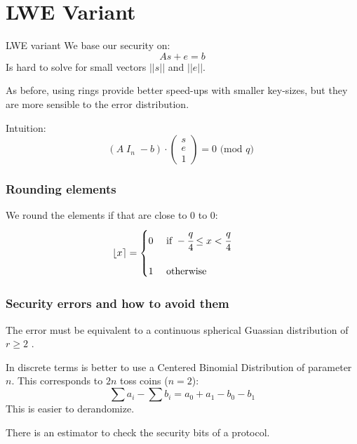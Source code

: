\documentclass[presentation]{beamer}
\begin{document}
\section{LWE Variant}
\begin{frame}[label=lwe-variant]{LWE variant}
  We base our security on:
  \[
    As + e = b
  \]
  Is hard to solve for small vectors $||s||$ and $||e||$.

  As before, using rings provide better speed-ups with 
  smaller key-sizes, \alert{but} they are more sensible 
  to the error distribution. \pause

  Intuition:
  \[
    (A \; I_n \;-b)\cdot \left( 
      \begin{array}{c}
        s 
        \\e 
        \\1 
      \end{array}
    \right) = 0 \text{ (mod $q$) }
  \]
\end{frame}
\begin{frame}[label=rounding]
  \frametitle{Rounding elements}
  We round the elements if that are close to $0$ to 0:
  \begin{equation}
    \lfloor x \rceil = \begin{cases}
      0 &\text{ if } -\cfrac{q}{4} \leq x < \cfrac{q}{4} \\
      \\
      1 &\text{ otherwise}
    \end{cases} \qquad
  \end{equation}
\end{frame}
\begin{frame}[label=security-errors-and-how-to-avoid-them]
  \frametitle{Security errors and how to avoid them}
  The error must be equivalent to a continuous spherical Guassian
  distribution of $r \geq 2$ \cite{how-not-to-instantiate}.

  In discrete terms is better to use a Centered Binomial
  Distribution of parameter $n$. This corresponds to $2n$ 
  toss coins ($n = 2$):
  \[
    \sum a_i - \sum b_i = a_0 + a_1 - b_0 - b_1
  \]
  This is easier to derandomize.
  \pause

  There is an estimator \cite{laticce-estimator} to check the
  security bits of a protocol.
\end{frame}
\end{document}
